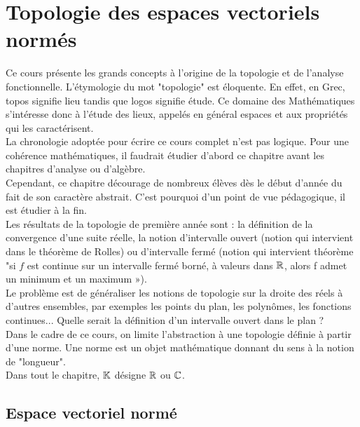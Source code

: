 \documentclass{book}
\begin{document}
\chapter*{Topologie des espaces vectoriels normés}

Ce cours présente les grands concepts à l'origine de la topologie et de l'analyse fonctionnelle.
L'étymologie du mot "topologie" est éloquente. En effet, en Grec, topos signifie lieu tandis que
logos signifie étude. Ce domaine des Mathématiques s'intéresse donc à l'étude des lieux, appelés en général espaces et
aux propriétés qui les caractérisent.\\
La chronologie adoptée pour écrire ce cours complet n'est pas logique. Pour une cohérence mathématiques, il faudrait étudier d'abord ce chapitre avant les chapitres d'analyse ou d'algèbre. \\
Cependant, ce chapitre décourage de nombreux élèves dès le début d'année du fait de son caractère abstrait. C'est pourquoi d'un point de vue  pédagogique, il est étudier à la fin.\\
Les résultats de la topologie de première année sont  :  la définition de la convergence
d'une suite réelle, la notion d'intervalle ouvert (notion qui intervient dans le théorème de Rolles) ou d'intervalle fermé (notion qui intervient 
théorème "si $f$ est continue sur un intervalle fermé borné, à valeurs dans $\mathbb{R}$, alors f admet un minimum et un maximum »).\\
Le problème est de généraliser les notions de topologie sur la droite des réels à d'autres ensembles, par exemples les points du plan, les polynômes, les fonctions continues...  Quelle serait la définition d'un intervalle ouvert dans le plan ? \\
Dans le cadre de ce cours, on limite l'abstraction à une topologie définie à partir d'une norme. Une norme est un objet mathématique donnant du sens à la notion de "longueur".\\
Dans tout le chapitre, $\mathbb{K}$ désigne $\mathbb{R}$ ou $\mathbb{C}$.


\section{Espace vectoriel normé}
\end{document}
